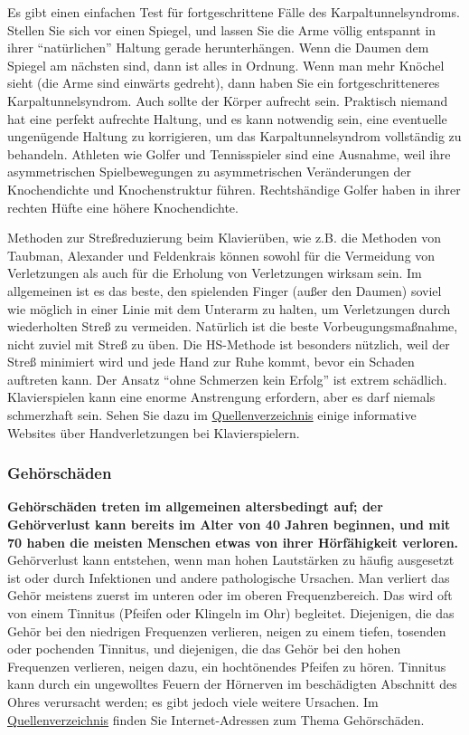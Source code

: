 Es gibt einen einfachen Test für fortgeschrittene Fälle des Karpaltunnelsyndroms.
Stellen Sie sich vor einen Spiegel, und lassen Sie die Arme völlig entspannt in ihrer \enquote{natürlichen} Haltung gerade herunterhängen.
Wenn die Daumen dem Spiegel am nächsten sind, dann ist alles in Ordnung.
Wenn man mehr Knöchel sieht (die Arme sind einwärts gedreht), dann haben Sie ein fortgeschritteneres Karpaltunnelsyndrom.
Auch sollte der Körper aufrecht sein.
Praktisch niemand hat eine perfekt aufrechte Haltung, und es kann notwendig sein, eine eventuelle ungenügende Haltung zu korrigieren, um das Karpaltunnelsyndrom vollständig zu behandeln.
Athleten wie Golfer und Tennisspieler sind eine Ausnahme, weil ihre asymmetrischen Spielbewegungen zu asymmetrischen Veränderungen der Knochendichte und Knochenstruktur führen.
Rechtshändige Golfer haben in ihrer rechten Hüfte eine höhere Knochendichte.

Methoden zur Streßreduzierung beim Klavierüben, wie z.B. die Methoden  von Taubman, Alexander und Feldenkrais können sowohl für die  Vermeidung von Verletzungen als auch für die Erholung von Verletzungen wirksam sein.
Im allgemeinen ist es das beste, den spielenden Finger (außer den Daumen) soviel wie möglich in einer Linie mit dem Unterarm zu halten, um Verletzungen durch wiederholten Streß zu vermeiden.
Natürlich ist die beste Vorbeugungsmaßnahme, nicht zuviel mit  Streß zu üben.
Die HS-Methode ist besonders nützlich, weil der Streß minimiert wird  und jede Hand zur Ruhe kommt, bevor ein Schaden auftreten kann.
Der Ansatz \enquote{ohne Schmerzen kein Erfolg} ist extrem schädlich.
Klavierspielen kann eine enorme Anstrengung erfordern, aber es darf niemals  schmerzhaft sein.
Sehen Sie dazu im \hyperref[Websites]{Quellenverzeichnis}  einige informative Websites über Handverletzungen bei Klavierspielern.


\subsubsection{Gehörschäden}
\label{c1iii10gehoer}

\textbf{Gehörschäden treten im allgemeinen altersbedingt auf; der Gehörverlust kann bereits im Alter von 40 Jahren beginnen, und mit 70 haben die meisten Menschen etwas von ihrer Hörfähigkeit verloren.}
Gehörverlust kann entstehen, wenn man hohen Lautstärken zu häufig ausgesetzt ist oder durch Infektionen und andere pathologische Ursachen.
Man verliert das Gehör meistens zuerst im unteren oder im oberen Frequenzbereich.
Das wird oft von einem Tinnitus (Pfeifen oder Klingeln im Ohr) begleitet.
Diejenigen, die das Gehör bei den niedrigen Frequenzen verlieren, neigen zu einem tiefen, tosenden oder pochenden Tinnitus, und diejenigen, die das Gehör bei den hohen Frequenzen verlieren, neigen dazu, ein hochtönendes Pfeifen zu hören.
Tinnitus kann durch ein ungewolltes Feuern der Hörnerven im beschädigten Abschnitt des Ohres verursacht werden; es gibt jedoch viele weitere Ursachen.
Im \hyperref[Websites]{Quellenverzeichnis} finden Sie Internet-Adressen zum Thema Gehörschäden.

